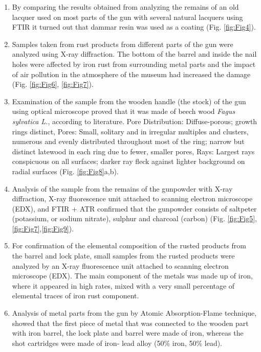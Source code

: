 \begin{enumerate}
	\item By comparing the results obtained from analyzing the remains of an old lacquer used on most parts of the gun with several natural lacquers using FTIR it turned out that dammar resin was used as a coating (Fig. \ref{fig:Fig4}). 
	\item Samples taken from rust products from different parts of the gun were analyzed using X-ray diffraction. The bottom of the barrel and inside the nail holes were affected by iron rust from surrounding metal parts and the impact of air pollution in the atmosphere of the museum had increased the damage (Fig. \ref{fig:Fig6}, \ref{fig:Fig7}).  
	\item Examination of the sample from the wooden handle (the stock) of the gun using optical microscope proved that it was made of beech wood \textit{Fagus sylvatica L.}, according to literature. Pore Distribution: Diffuse-porous; growth rings distinct, Pores: Small, solitary and in irregular multiples and clusters, numerous and evenly distributed throughout most of the ring; narrow but distinct latewood in each ring due to fewer, smaller pores, Rays: Largest rays conspicuous on all surfaces; darker ray fleck against lighter background on radial surfaces \parencite[117--118]{Hoadley_1990}(Fig. \ref{fig:Fig8}a,b).
	\item Analysis of the sample from the remains of the gunpowder with X-ray diffraction, X-ray fluorescence unit attached to scanning electron microscope (EDX), and FTIR + ATR confirmed that the gunpowder consists of saltpeter (potassium, or sodium nitrate), sulphur and charcoal (carbon) \parencites[3]{Driel_2000}[3--5]{Alexander_2012}[5]{Richard_2011} (Fig. \ref{fig:Fig5},\ref{fig:Fig7},\ref{fig:Fig9}).
	\item  For confirmation of the elemental composition of the rusted products from the barrel and lock plate, small samples from the rusted products were analyzed by an X-ray fluorescence unit attached to scanning electron microscope (EDX). The main component of the metals was made up of iron, where it appeared in high rates, mixed with a very small percentage of elemental traces of iron rust component.
	\item Analysis of metal parts from the gun by Atomic Absorption-Flame technique, showed that the first piece of metal that was connected to the wooden part with iron barrel, the lock plate and barrel were made of iron, whereas the shot cartridges were made of iron- lead alloy (50\% iron, 50\% lead). 
\end{enumerate}

